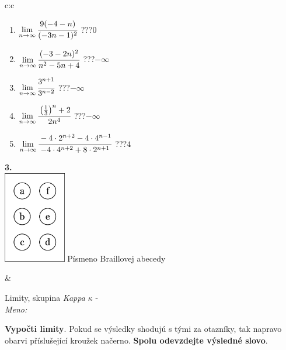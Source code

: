 \documentclass[10pt]{report}
\begin{document}
\begin{tabular}{c:c}
\begin{minipage}[c][104.5mm][t]{0.5\linewidth}
\begin{center}
\begin{minipage}{0.79\linewidth}
\begin{center}
\begin{varwidth}{\linewidth}
\begin{enumerate}
\item $\lim\limits_{n\to\infty}\cfrac{9(-4-n)}{(-3n-1)^2}$\quad \dotfill\; ???\;\dotfill \quad $0$
\item $\lim\limits_{n\to\infty}\cfrac{(-3-2n)^2}{n^2-5n+4}$\quad \dotfill\; ???\;\dotfill \quad $-\infty$
\item $\lim\limits_{n\to\infty}\cfrac{3^{n+1}}{3^{n-2}}$\quad \dotfill\; ???\;\dotfill \quad $-\infty$
\item $\lim\limits_{n\to\infty}\cfrac{\left(\frac{1}{3}\right)^n +2}{2n^{4}}$\quad \dotfill\; ???\;\dotfill \quad $-\infty$
\item $\lim\limits_{n\to\infty}\cfrac{-4\cdot 2^{n+2}-4\cdot 4^{n-1}}{-4\cdot 4^{n+2}+8\cdot 2^{n+1}}$\quad \dotfill\; ???\;\dotfill \quad $4$
\end{enumerate}
\end{varwidth}
\end{center}
\end{minipage}
\begin{minipage}{0.20\linewidth}
\begin{center}
{\Huge\bfseries 3.} \\[2mm]
\includegraphics[height=40mm]{../images/braille.png}
{\small Písmeno Braillovej abecedy}
\end{center}
\end{minipage}
\end{center}
\end{minipage}
&
\begin{minipage}[c][104.5mm][t]{0.5\linewidth}
\begin{center}
\vspace{7mm}
{\huge Limity, skupina \textit{Kappa $\kappa$} -}\\[5mm]
\textit{Meno:}\phantom{xxxxxxxxxxxxxxxxxxxxxxxxxxxxxxxxxxxxxxxxxxxxxxxxxxxxxxxxxxxxxxxxx}\\[5mm]
\begin{minipage}{0.95\linewidth}
\begin{center}
\textbf{Vypočti limity}. Pokud se výsledky shodujú s tými za otazníky, tak napravo\\obarvi příslušející kroužek načerno. \textbf{Spolu odevzdejte výsledné slovo}.

\end{center}
\end{minipage}
\end{center}
\end{minipage}
\end{tabular}
\end{document}
